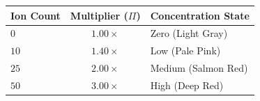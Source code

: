 \documentclass[11pt]{article}
\begin{document}
\begin{tcolorbox}[colback=cyan!5,colframe=cyan!50!black,title=Game Mechanic: Intracellular Ion Concentration]
	\centering
	{\small
	\begin{tabular}{lcl}
	\hline\hline
	\textbf{Ion Count} & \textbf{Multiplier ($\Pi$)} & \textbf{Concentration State} \\
	\hline
	$0$                & $1.00\times$                & Zero (Light Gray) \\ 
	$10$               & $1.40\times$                & Low (Pale Pink) \\ 
	$25$               & $2.00\times$                & Medium (Salmon Red) \\ 
	$50$               & $3.00\times$                & High (Deep Red) \\
	\hline\hline
	\end{tabular}
	}

\end{tcolorbox}
\end{document}
